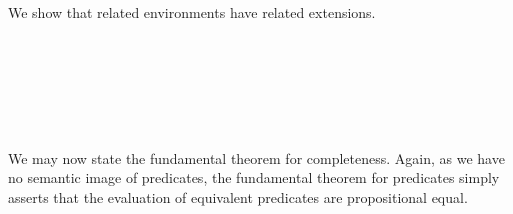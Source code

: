 \documentclass[authoryear, acmsmall, screen, review, nonacm]{acmart}
\begin{document}
\Ni We show that related environments have related extensions.
\begin{code}%
\>[0]\AgdaSpace{}%
\AgdaSymbol{:}%
\>[4267I]\AgdaSpace{}%
\AgdaSymbol{\{}\AgdaSpace{}%
\AgdaSpace{}%
\AgdaSymbol{:}\AgdaSpace{}%
\AgdaSpace{}%
\AgdaSpace{}%
\AgdaSymbol{\}}\AgdaSpace{}%
\AgdaSpace{}%
\AgdaSpace{}%
\AgdaSpace{}%
\AgdaSpace{}%
\<%
\\
\>[4267I][@{}l@{\AgdaIndent{0}}]%
\>[12]\AgdaSymbol{\{}\AgdaSpace{}%
\AgdaSpace{}%
\AgdaSymbol{:}\AgdaSpace{}%
\AgdaSpace{}%
\AgdaSpace{}%
\AgdaSymbol{\}}\AgdaSpace{}%
\<%
\\
%
\>[12]\AgdaSpace{}%
\AgdaSpace{}%
\AgdaSpace{}%
\<%
\\
%
\>[12]\AgdaSpace{}%
\AgdaSymbol{(}\AgdaSpace{}%
\AgdaSpace{}%
\AgdaSymbol{)}\AgdaSpace{}%
\AgdaSymbol{(}\AgdaSpace{}%
\AgdaSpace{}%
\AgdaSymbol{)}\<%
\\
\>[0]\AgdaSpace{}%
\AgdaSpace{}%
\AgdaSpace{}%
\AgdaSpace{}%
\AgdaSymbol{=}\AgdaSpace{}%
\<%
\\
\>[0]\AgdaSpace{}%
\AgdaSpace{}%
\AgdaSpace{}%
\AgdaSymbol{(}\AgdaSpace{}%
\AgdaSymbol{)}\AgdaSpace{}%
\AgdaSymbol{=}\AgdaSpace{}%
\AgdaSpace{}%
\<%
\end{code}


We may now state the fundamental theorem for completeness. Again, as we have no semantic image of predicates, the fundamental theorem for predicates simply asserts that the evaluation of equivalent predicates are propositional equal.
\end{document}
